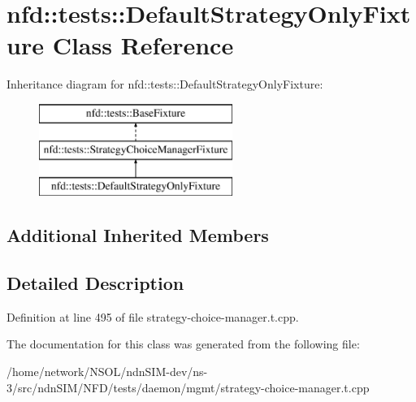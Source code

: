 \hypertarget{classnfd_1_1tests_1_1DefaultStrategyOnlyFixture}{}\section{nfd\+:\+:tests\+:\+:Default\+Strategy\+Only\+Fixture Class Reference}
\label{classnfd_1_1tests_1_1DefaultStrategyOnlyFixture}
Inheritance diagram for nfd\+:\+:tests\+:\+:Default\+Strategy\+Only\+Fixture\+:\begin{figure}[H]
\begin{center}
\leavevmode
\includegraphics[height=3.000000cm]{classnfd_1_1tests_1_1DefaultStrategyOnlyFixture}
\end{center}
\end{figure}
\subsection*{Additional Inherited Members}


\subsection{Detailed Description}


Definition at line 495 of file strategy-\/choice-\/manager.\+t.\+cpp.



The documentation for this class was generated from the following file\+:\begin{DoxyCompactItemize}
\item 
/home/network/\+N\+S\+O\+L/ndn\+S\+I\+M-\/dev/ns-\/3/src/ndn\+S\+I\+M/\+N\+F\+D/tests/daemon/mgmt/strategy-\/choice-\/manager.\+t.\+cpp\end{DoxyCompactItemize}
